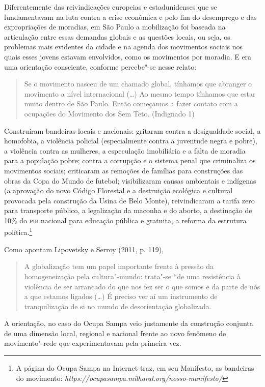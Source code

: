 Diferentemente das reivindicações europeias e estadunidenses que se
fundamentavam na luta contra a crise econômica e pelo fim do desemprego
e das expropriações de moradias, em São Paulo a mobilização foi baseada
na articulação entre essas demandas globais e as questões locais, ou
seja, os problemas mais evidentes da cidade e na agenda dos movimentos
sociais nos quais esses jovens estavam envolvidos, como os movimentos
por moradia. E era uma orientação consciente, conforme percebe"-se nesse
relato:

\begin{quote}
Se o movimento nasceu de um chamado global, tínhamos que abranger o
movimento a nível internacional (\ldots{}) Ao mesmo tempo tínhamos que estar
muito dentro de São Paulo. Então começamos a fazer contato com a
ocupações do Movimento dos Sem Teto. (Indignado 1)
\end{quote}

Construíram bandeiras locais e nacionais: gritaram contra a desigualdade
social, a homofobia, a violência policial (especialmente contra a
juventude negra e pobre), a violência contra as mulheres, a especulação
imobiliária e a falta de moradia para a população pobre; contra a
corrupção e o sistema penal que criminaliza os movimentos sociais;
criticaram as remoções de famílias para construções das obras da Copa do
Mundo de futebol; visibilizaram causas ambientais e indígenas (a
aprovação do novo Código Florestal e a destruição ecológica e cultural
provocada pela construção da Usina de Belo Monte), reivindicaram a
tarifa zero para transporte público, a legalização da maconha e do
aborto, a destinação de 10\% do \textsc{pib} nacional para educação pública e
gratuita, a reforma da estrutura política.\footnote{A página do Ocupa
  Sampa na Internet traz, em seu Manifesto, as bandeiras do movimento:
  \emph{https://ocupasampa.milharal.org/nosso-manifesto/}}

Como apontam Lipovetsky e Serroy (2011, p. 119),

\begin{quote}
A globalização tem um papel importante frente à pressão da
homogeneização pela cultura"-mundo: trata"-se ``de uma resistência à
violência de ser arrancado do que nos fez ser o que somos e da parte de
nós a que estamos ligados (\ldots{}) É preciso ver aí um instrumento de
tranquilização de si no mundo de desorientação globalizada.
\end{quote}

A orientação, no caso do Ocupa Sampa veio justamente da construção
conjunta de uma dimensão local, regional e nacional frente ao novo
fenômeno de movimento"-rede que experimentavam pela primeira vez.

